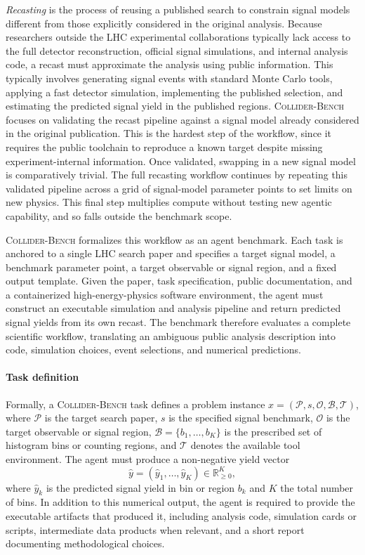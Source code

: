 \documentclass{article}
\newcommand{\ColliderBench}{\textsc{Collider-Bench}}
\begin{document}
\emph{Recasting} is the process of reusing a published search to constrain signal models different from those explicitly considered in the original analysis. Because researchers outside the LHC experimental collaborations typically lack access to the full detector reconstruction, official signal simulations, and internal analysis code, a recast must approximate the analysis using public information. This typically involves generating signal events with standard Monte Carlo tools, applying a fast detector simulation, implementing the published selection, and estimating the predicted signal yield in the published regions. \ColliderBench{} focuses on validating the recast pipeline against a signal model already considered in the original publication. This is the hardest step of the workflow, since it requires the public toolchain to reproduce a known target despite missing experiment-internal information. Once validated, swapping in a new signal model is comparatively trivial. The full recasting workflow continues by repeating this validated pipeline across a grid of signal-model parameter points to set limits on new physics. This final step multiplies compute without testing new agentic capability, and so falls outside the benchmark scope.

\ColliderBench{} formalizes this workflow as an agent benchmark. Each task is anchored to a single LHC search paper and specifies a target signal model, a benchmark parameter point, a target observable or signal region, and a fixed output template. Given the paper, task specification, public documentation, and a containerized high-energy-physics software environment, the agent must construct an executable simulation and analysis pipeline and return predicted signal yields from its own recast. The benchmark therefore evaluates a complete scientific workflow, translating an ambiguous public analysis description into code, simulation choices, event selections, and numerical predictions.

\paragraph{Task definition} Formally, a \ColliderBench{} task defines a problem instance $x = (\mathcal{P}, s, \mathcal{O}, \mathcal{B}, \mathcal{T})$, where $\mathcal{P}$ is the target search paper, $s$ is the specified signal benchmark, $\mathcal{O}$ is the target observable or signal region, $\mathcal{B}=\{b_1,\ldots,b_K\}$ is the prescribed set of histogram bins or counting regions, and $\mathcal{T}$ denotes the available tool environment. The agent must produce a non-negative yield vector
%
\begin{equation}
\hat{y} = (\hat{y}_1,\ldots,\hat{y}_K) \in \mathbb{R}_{\geq 0}^K,
\end{equation}
%
where \(\hat{y}_k\) is the predicted signal yield in bin or region \(b_k\) and $K$ the total number of bins. In addition to this numerical output, the agent is required to provide the executable artifacts that produced it, including analysis code, simulation cards or scripts, intermediate data products when relevant, and a short report documenting methodological choices.
\end{document}
